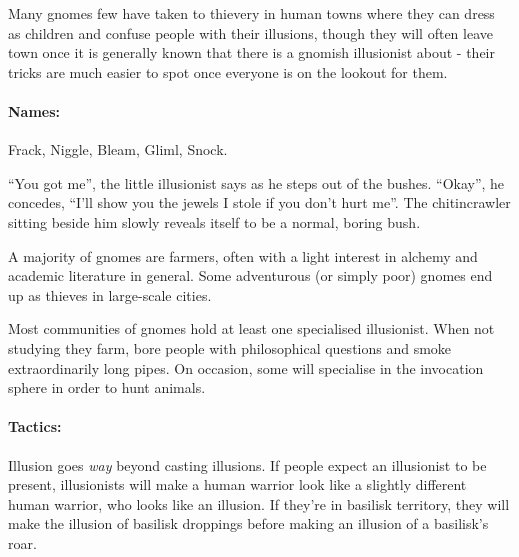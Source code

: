 \begin{multicols}{2}
Many gnomes few have taken to thievery in human towns where they can dress as children and confuse people with their illusions, though they will often leave town once it is generally known that there is a gnomish illusionist about - their tricks are much easier to spot once everyone is on the lookout for them.

\paragraph{Names:} Frack, Niggle, Bleam, Gliml, Snock.

\begin{boxtext}

	``You got me'', the little illusionist says as he steps out of the bushes.
	``Okay'', he concedes, ``I'll show you the jewels I stole if you don't hurt me''.
	The chitincrawler sitting beside him slowly reveals itself to be a normal, boring bush.

\end{boxtext}

\label{gnomish_citizen}

A majority of gnomes are farmers, often with a light interest in alchemy and academic literature in general.  Some adventurous (or simply poor) gnomes end up as thieves in large-scale cities.


\label{gnomish_illusionist}

Most communities of gnomes hold at least one specialised illusionist.  When not studying they farm, bore people with philosophical questions and smoke extraordinarily long pipes.  On occasion, some will specialise in the invocation sphere in order to hunt animals.


\paragraph{Tactics:} Illusion goes \emph{way} beyond casting illusions.
If people expect an illusionist to be present, illusionists will make a human warrior look like a slightly different human warrior, who looks like an illusion.
If they're in basilisk territory, they will make the illusion of basilisk droppings before making an illusion of a basilisk's roar.

\begin{boxtext}


\end{boxtext}
\end{multicols}
